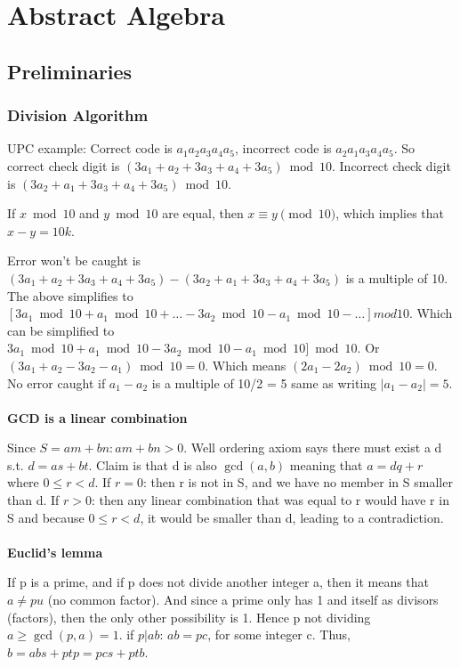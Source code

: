 \section{Abstract Algebra}

\subsection{Preliminaries}

\subsubsection{Division Algorithm}

UPC example:
Correct code is $a_1 a_2 a_3 a_4 a_5$, incorrect code is $a_2 a_1 a_3 a_4 a_5$.
So correct check digit is $(3a_1 + a_2 + 3a_3 + a_4 + 3a_5) \bmod 10$. 
Incorrect check digit is $(3a_2 + a_1 + 3a_3 + a_4 + 3a_5) \bmod 10$. 

If $x \bmod 10$ and $y \bmod 10$ are equal, then $x \equiv y \pmod 10$, which implies that $x - y = 10k$.

Error won’t be caught is $(3a_1 + a_2 + 3a_3 + a_4 + 3a_5) - (3a_2 + a_1 + 3a_3 + a_4 + 3a_5)$ is a multiple of 10. 
The above simplifies to $[3a_1 \bmod 10 + a_1 \bmod 10 + \dots - 3a_2 \bmod 10 - a_1 \bmod 10 - \dots] mod 10$.
Which can be simplified to $3a_1 \bmod 10 + a_1 \bmod 10 - 3a_2 \bmod 10 - a_1 \bmod 10] \bmod 10$.
Or $(3a_1 + a_2 - 3a_2 - a_1) \bmod 10 = 0$. 
Which means $(2a_1 - 2a_2) \bmod 10 = 0$.
No error caught if $a_1 - a_2$ is a multiple of 10/2 = 5 same as writing $|a_1 - a_2| = 5$.
\\~\\

\textbf{GCD is a linear combination}

Since $S = { am + bn : am + bn > 0}$.
Well ordering axiom says there must exist a d s.t. $d = as + bt$.
Claim is that d is also $\gcd(a ,b)$ meaning that $a = dq + r$ where $0 \leq r < d$.
If $r = 0$: then r is not in S, and we have no member in S smaller than d.
If $r > 0$: then any linear combination that was equal to r would have r in S and because $0 \leq r < d$,
it would be smaller than d, leading to a contradiction.
\\~\\

\textbf{Euclid’s lemma}

If p is a prime, and if p does not divide another integer a, then it means that $a \neq pu$ (no common factor).
And since a prime only has 1 and itself as divisors (factors), then the only other possibility is 1.
Hence p not dividing $a \geq \gcd(p, a) = 1$.
if $p | ab$: $ab = pc$, for some integer c.
Thus, $b = abs + ptp = pcs + ptb$.
\\~\\

